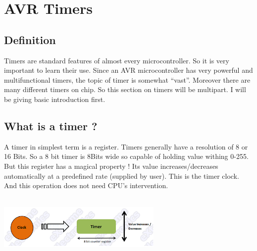 \section{AVR Timers}

\subsection{Definition}
Timers are standard features of almost every microcontroller. So it is very important to learn their use. Since an AVR microcontroller has very powerful and multifunctional timers, the topic of timer is somewhat “vast”. Moreover there are many different timers on chip. So this section on timers will be multipart. I will be giving basic introduction first.


\subsection{What is a timer ?}
A timer in simplest term is a register. Timers generally have a resolution of 8 or 16 Bits. So a 8 bit timer is 8Bits wide so capable of holding value withing 0-255. But this register has a magical property ! Its value increases/decreases automatically at a predefined rate (supplied by user). This is the timer clock. And this operation does not need CPU’s intervention.
\\\\
\centerline{
	\includegraphics[width=0.6\textwidth]{overview/images/timer1.png}
}


